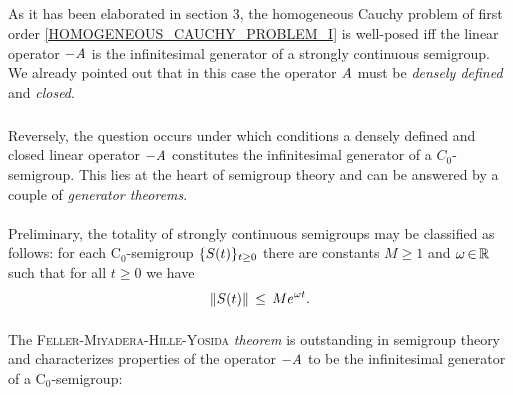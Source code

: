 \documentclass[11pt,twoside]{article}
\begin{document}
\subparagraph{} %
As it has been elaborated in section 3,
the homogeneous Cauchy problem of first order
\eqref{HOMOGENEOUS_CAUCHY_PROBLEM_I} is well-posed iff
the linear operator ${-}\mathit{A}$ is the infinitesimal generator
of a strongly continuous semigroup.
We already pointed out that
in this case
the operator $\mathit{A}$ must be \textit{densely defined} and \textit{closed}.

\subparagraph{} %
Reversely,
the question occurs
under which conditions a densely defined and closed linear operator ${-}\mathit{A}$
constitutes the infinitesimal generator of a $C_0$-semigroup.
This lies at the heart of semigroup theory and
can be answered by a couple of \textit{generator theorems}.

\paragraph{} %
Preliminary,
the totality of strongly continuous semigroups may be classified as follows:
for each C$_0$-semigroup $\{{S}(t)\}_{t \geq 0}$
there are constants $M \geq 1$ and $\omega {\,\in\,} {\mathbb{R}}$
such that for all $t \geq 0$ we have
\[
\left\lVert {S}(t) \right\rVert \, \leq \, M e^{\omega t}.
\]

\paragraph{} %
The \textsc{Feller-Miyadera-Hille-Yosida} \textit{theorem}
is outstanding in semigroup theory
and characterizes properties of the operator ${-}\mathit{A}$
to be the infinitesimal generator of a C$_0$-semigroup: 
\end{document}
